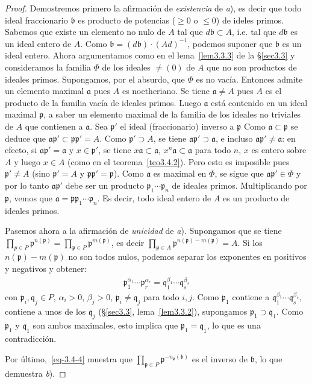 \documentclass[oneside,bibtotoc,leqno,spanish]{amsbook}
\newcommand{\idl}[1]{\mathfrak{#1}}
\numberwithin{equation}{section}
\theoremstyle{defi}
\theoremstyle{note}
\theoremstyle{rem}
\numberwithin{theorem}{section}
\numberwithin{proposition}{section}
\numberwithin{definition}{section}
\numberwithin{lemma}{section}
\numberwithin{corollary}{section}
\numberwithin{example}{section}
\numberwithin{footnote}{section}%
\begin{document}
\begin{proof}
Demostremos primero la afirmaci\'on de {\em existencia} de {\itshape a}), es decir que todo ideal fraccionario
$\idl{b}$ es producto de potencias ($\geq 0$ o $\leq 0$) de ideles primos. Sabemos que existe un
elemento no nulo de $A$ tal que $d\idl{b}\subset A$, i.e. tal que $d\idl{b}$ es un ideal entero de $A$.
Como $\idl{b} = (d\idl{b})\cdot(Ad)^{-1}$, podemos suponer que $\idl{b}$ es un ideal entero. Ahora
argumentamos como en el lema~\ref{lem3.3.3} de la \S\ref{sec3.3} y consideramos la familia $\Phi$ de los ideales $\neq(0)$ de
$A$ que no son productos de ideales primos. Supongamos, por el absurdo, que $\Phi$ es no vac\'ia. Entonces
admite un elemento maximal $\idl{a}$ pues $A$ es noetheriano. Se tiene $\idl{a}\neq A$ pues $A$ es el
producto de la familia vac\'ia de ideales primos. Luego $\idl{a}$ est\'a contenido en un ideal maximal
$\idl{p}$, a saber un elemento maximal de la familia de los ideales no triviales de $A$ que contienen
a $\idl{a}$. Sea $\idl{p}'$ el ideal (fraccionario) inverso a $\idl{p}$ Como $\idl{a}\subset\idl{p}$ se deduce que
$\idl{a}\idl{p}'\subset\idl{p}\idl{p}' = A$. Como $\idl{p}'\supset A$, se tiene $\idl{a}\idl{p}'\supset\idl{a}$,
e incluso $\idl{a}\idl{p}'\neq\idl{a}$: en efecto, si $\idl{a}\idl{p}' = \idl{a}$ y $x\in\idl{p}'$, se tiene
$x\idl{a}\subset\idl{a}$, $x^{n}\idl{a}\subset\idl{a}$ para todo $n$, $x$ es entero sobre $A$ y luego $x\in A$
(como en el teorema~\ref{teo3.4.2}). Pero esto es imposible pues $\idl{p}'\neq A$ (sino $\idl{p}' = A$ y $\idl{p}\idl{p}'=\idl{p}$).
Como $\idl{a}$ es maximal en $\Phi$, se sigue que $\idl{a}\idl{p}'\in\Phi$ y por lo tanto $\idl{a}\idl{p}'$ debe
ser un producto $\idl{p}_{1}\cdots\idl{p}_{n}$ de ideales primos. Multiplicando por $\idl{p}$, vemos que
$\idl{a} = \idl{p}\idl{p}_{1}\cdots\idl{p}_{n}$. Es decir, todo ideal entero de $A$ es un producto de ideales primos.

Pasemos ahora a la afirmaci\'on de {\em unicidad} de {\itshape a}). Supongamos que se tiene $\prod_{p\in P}\idl{p}^{n(\idl{p})}
=\prod_{\idl{p}\in P}\idl{p}^{m(\idl{p})}$, es decir $\prod_{\idl{p}\in A}\idl{p}^{n(\idl{p})-m(\idl{p})}=A$.
Si los $n(\idl{p})-m(\idl{p})$ no son todos nulos, podemos separar los exponentes en positivos y negativos y
obtener:
\begin{gather}
\idl{p}_{1}^{\alpha_{1}}\cdots\idl{p}_{r}^{\alpha_{r}} = \idl{q}_{1}^{\beta_{1}}\cdots\idl{q}_{s}^{\beta_{s}}
\end{gather}
con $\idl{p}_{i},\idl{q}_{j}\in P$, $\alpha_{i} > 0$, $\beta_{j} > 0$, $\idl{p}_{i}\neq\idl{q}_{j}$ para todo
$i, j$. Como $\idl{p}_{1}$ contiene a $\idl{q}_{1}^{\beta_{1}}\cdots\idl{q}_{s}^{\beta_{s}}$, contiene
a unos de los $\idl{q}_{j}$ (\S\ref{sec3.3}, lema~\ref{lem3.3.2}), supongamos $\idl{p}_{1}\supset\idl{q}_{1}$. Como
$\idl{p}_{1}$ y $\idl{q}_{1}$ son ambos maximales, esto implica que $\idl{p}_{1}=\idl{q}_{1}$, lo que
es una contradicci\'on.

Por \'ultimo,~\eqref{eq-3.4-4} muestra que $\prod_{\idl{p}\in P}\idl{p}^{-n_{\idl{p}}(\idl{b})}$ es el inverso
de $\idl{b}$, lo que demuestra {\itshape b}).
\end{proof}
\end{document}
